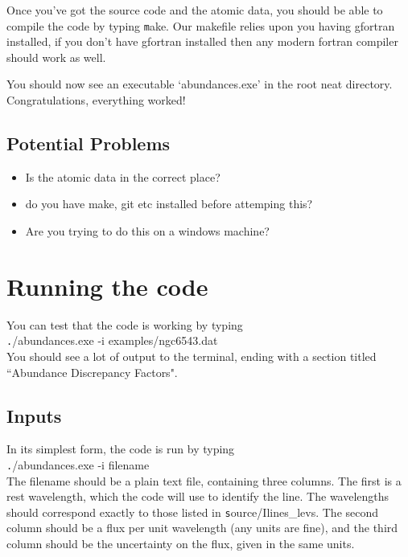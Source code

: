 \documentclass[11pt,a4paper]{article}
\begin{document}
Once you've got the source code and the atomic data, you should be able to compile the code by typing {\texttt make}. Our makefile relies upon you having gfortran installed, if you don't have gfortran installed then any modern fortran compiler should work as well\footnotemark. 


You should now see an executable `abundances.exe' in the root neat directory. Congratulations, everything worked!

\subsection{Potential Problems}
\begin{itemize}
\item Is the atomic data in the correct place?
\item do you have make, git etc installed before attemping this?
\item Are you trying to do this on a windows machine?
\end{itemize}

\section{Running the code}

You can test that the code is working by typing
\\

{\texttt ./abundances.exe -i examples/ngc6543.dat}
\\

You should see a lot of output to the terminal, ending with a section titled ``Abundance Discrepancy Factors".

\subsection{Inputs}

In its simplest form, the code is run by typing
\\

{\texttt ./abundances.exe -i filename}
\\

The filename should be a plain text file, containing three columns.  The first is a rest wavelength, which the code will use to identify the line.  The wavelengths should correspond exactly to those listed in {\texttt source/Ilines\_levs}.  The second column should be a flux per unit wavelength (any units are fine), and the third column should be the uncertainty on the flux, given in the same units.
\end{document}
